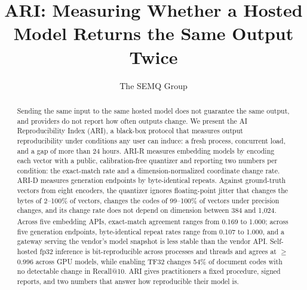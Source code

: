 \documentclass{article}
\title{ARI: Measuring Whether a Hosted Model Returns the Same Output Twice}
\author{The SEMQ Group}
\newcommand{\pend}[1]{\textcolor{inkMuted}{#1}\textsuperscript{\textcolor{inkMuted}{\dag}}}
\begin{document}
\maketitle

\begin{abstract}
Sending the same input to the same hosted model does not guarantee the same output, and providers do not report how often outputs change. We present the AI Reproducibility Index (ARI), a black-box protocol that measures output reproducibility under conditions any user can induce: a fresh process, concurrent load, and a gap of more than 24 hours. ARI-R measures embedding models by encoding each vector with a public, calibration-free quantizer and reporting two numbers per condition: the exact-match rate and a dimension-normalized coordinate change rate. ARI-D measures generation endpoints by byte-identical repeats. Against ground-truth vectors from eight encoders, the quantizer ignores floating-point jitter that changes the bytes of 2--100\% of vectors, changes the codes of 99--100\% of vectors under precision changes, and its change rate does not depend on dimension between 384 and 1{,}024. Across five embedding APIs, exact-match agreement ranges from \pend{0.169} to \pend{1.000}; across five generation endpoints, byte-identical repeat rates range from 0.107 to 1.000, and a gateway serving the vendor's model snapshot is less stable than the vendor API. Self-hosted fp32 inference is bit-reproducible across processes and threads and agrees at $\ge$0.996 across GPU models, while enabling TF32 changes 54\% of document codes with no detectable change in Recall@10. ARI gives practitioners a fixed procedure, signed reports, and two numbers that answer how reproducible their model is.
\end{abstract}

\end{document}
